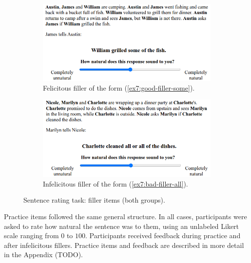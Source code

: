 \begin{figure}[H]
	\centering
	\begin{subfigure}[b]{.45\linewidth}
		\centering
		\includegraphics[width=\linewidth]{./exp1-screen-filler-good.png}
		\caption[]{Felicitous filler of the form (\ref{ex7:good-filler-some}).}
	\end{subfigure}
	\hfill
	\begin{subfigure}[b]{.45\linewidth}
		\centering
		\includegraphics[width=\linewidth]{./exp1-screen-filler-bad.png}
		\caption[]{Infelicitous filler of the form (\ref{ex7:bad-filler-all}).}
	\end{subfigure}

	\caption[]{Sentence rating task: filler items (both groups).}\label{fig7:exp1-screen-fillers}
\end{figure}


Practice items followed the same general structure. In all cases, participants were asked to rate how natural the sentence was to them, using an unlabeled Likert scale ranging from $0$ to $100$. Participants received feedback during practice and after infelicitous fillers. Practice items and feedback are described in more detail in the Appendix (TODO).\\

